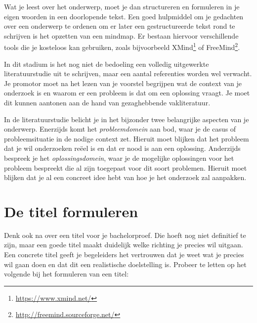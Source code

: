 Wat je leest over het onderwerp, moet je dan structureren en formuleren in je eigen woorden in een doorlopende tekst. Een goed hulpmiddel om je gedachten over een onderwerp te ordenen om er later een gestructureerde tekst rond te schrijven is het opzetten van een mindmap. Er bestaan hiervoor verschillende tools die je kosteloos kan gebruiken, zoals bijvoorbeeld XMind\footnote{\url{https://www.xmind.net/}} of FreeMind\footnote{\url{http://freemind.sourceforge.net/}}.

In dit stadium is het nog niet de bedoeling een volledig uitgewerkte literatuurstudie uit te schrijven, maar een aantal referenties worden wel verwacht. Je promotor moet na het lezen van je voorstel begrijpen wat de context van je onderzoek is en waarom er een probleem is dat om een oplossing vraagt. Je moet dit kunnen aantonen aan de hand van gezaghebbende vakliteratuur.

In de literatuurstudie belicht je in het bijzonder twee belangrijke aspecten van je onderwerp. Enerzijds komt het \emph{probleemdomein} aan bod, waar je de casus of probleemsituatie in de nodige context zet. Hieruit moet blijken dat het probleem dat je wil onderzoeken reëel is en dat er nood is aan een oplossing. Anderzijds bespreek je het \emph{oplossingsdomein}, waar je de mogelijke oplossingen voor het probleem bespreekt die al zijn toegepast voor dit soort problemen. Hieruit moet blijken dat je al een concreet idee hebt van hoe je het onderzoek zal aanpakken.

\section{De titel formuleren}%
\label{sec:onderwerp_titel}

Denk ook na over een titel voor je bachelorproef. Die hoeft nog niet definitief te zijn, maar een goede titel maakt duidelijk welke richting je precies wil uitgaan. Een concrete titel geeft je begeleiders het vertrouwen dat je weet wat je precies wil gaan doen en dat dit een realistische doelstelling is. Probeer te letten op het volgende bij het formuleren van een titel:

